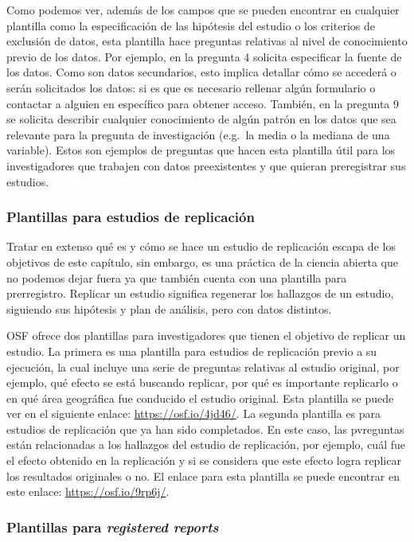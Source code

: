 \documentclass[
  spanish,
  a4paper,
  oneside]{scrbook}
\begin{document}
Como podemos ver, además de los campos que se pueden encontrar en
cualquier plantilla como la especificación de las hipótesis del estudio
o los criterios de exclusión de datos, esta plantilla hace preguntas
relativas al nivel de conocimiento previo de los datos. Por ejemplo, en
la pregunta 4 solicita especificar la fuente de los datos. Como son
datos secundarios, esto implica detallar cómo se accederá o serán
solicitados los datos: si es que es necesario rellenar algún formulario
o contactar a alguien en específico para obtener acceso. También, en la
pregunta 9 se solicita describir cualquier conocimiento de algún patrón
en los datos que sea relevante para la pregunta de investigación
(e.g.~la media o la mediana de una variable). Estos son ejemplos de
preguntas que hacen esta plantilla útil para los investigadores que
trabajen con datos preexistentes y que quieran preregistrar sus
estudios.

\subsubsection{Plantillas para estudios de
replicación}\label{plantillas-para-estudios-de-replicaciuxf3n}

Tratar en extenso qué es y cómo se hace un estudio de replicación escapa
de los objetivos de este capítulo, sin embargo, es una práctica de la
ciencia abierta que no podemos dejar fuera ya que también cuenta con una
plantilla para prerregistro. Replicar un estudio significa regenerar los
hallazgos de un estudio, siguiendo sus hipótesis y plan de análisis,
pero con datos distintos.

OSF ofrece dos plantillas para investigadores que tienen el objetivo de
replicar un estudio. La primera es una plantilla para estudios de
replicación previo a su ejecución, la cual incluye una serie de
preguntas relativas al estudio original, por ejemplo, qué efecto se está
buscando replicar, por qué es importante replicarlo o en qué área
geográfica fue conducido el estudio original. Esta plantilla se puede
ver en el siguiente enlace: \url{https://osf.io/4jd46/}. La segunda
plantilla es para estudios de replicación que ya han sido completados.
En este caso, las pvreguntas están relacionadas a los hallazgos del
estudio de replicación, por ejemplo, cuál fue el efecto obtenido en la
replicación y si se considera que este efecto logra replicar los
resultados originales o no. El enlace para esta plantilla se puede
encontrar en este enlace: \url{https://osf.io/9rp6j/}.

\subsubsection{\texorpdfstring{Plantillas para \emph{registered
reports}}{Plantillas para registered reports}}\label{plantillas-para-registered-reports}
\end{document}
